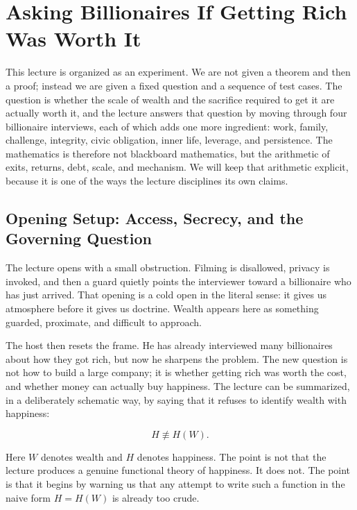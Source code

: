\chapter{Asking Billionaires If Getting Rich Was Worth It}

This lecture is organized as an experiment. We are not given a theorem and then a proof; instead we are given a fixed question and a sequence of test cases. The question is whether the scale of wealth and the sacrifice required to get it are actually worth it, and the lecture answers that question by moving through four billionaire interviews, each of which adds one more ingredient: work, family, challenge, integrity, civic obligation, inner life, leverage, and persistence. The mathematics is therefore not blackboard mathematics, but the arithmetic of exits, returns, debt, scale, and mechanism. We will keep that arithmetic explicit, because it is one of the ways the lecture disciplines its own claims.

\section{Opening Setup: Access, Secrecy, and the Governing Question}

The lecture opens with a small obstruction. Filming is disallowed, privacy is invoked, and then a guard quietly points the interviewer toward a billionaire who has just arrived. That opening is a cold open in the literal sense: it gives us atmosphere before it gives us doctrine. Wealth appears here as something guarded, proximate, and difficult to approach.

The host then resets the frame. He has already interviewed many billionaires about how they got rich, but now he sharpens the problem. The new question is not how to build a large company; it is whether getting rich was worth the cost, and whether money can actually buy happiness. The lecture can be summarized, in a deliberately schematic way, by saying that it refuses to identify wealth with happiness:

\begin{equation}
H \not\equiv H(W).
\end{equation}

Here \(W\) denotes wealth and \(H\) denotes happiness. The point is not that the lecture produces a genuine functional theory of happiness. It does not. The point is that it begins by warning us that any attempt to write such a function in the naive form \(H=H(W)\) is already too crude.

